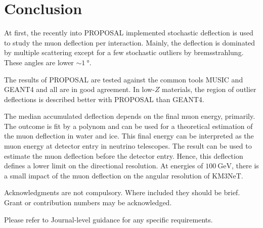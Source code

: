 \documentclass[pdflatex, sn-mathphys]{sn-jnl}%
\theoremstyle{thmstyleone}%
\theoremstyle{thmstyletwo}%
\theoremstyle{thmstylethree}%
\begin{document}
\section{Conclusion}\label{sec:conclusion}

At first, the recently into PROPOSAL implemented stochastic deflection is 
used to study the muon deflection per interaction. Mainly, the deflection 
is dominated by multiple scattering except for a few stochastic 
outliers by bremsstrahlung. These angles are lower $\sim\SI{1}{\degree}$. 

The results of PROPOSAL are tested against the common tools MUSIC and 
GEANT4 and all are in good agreement. In low-$Z$ materials, the region of outlier 
deflections is described better with PROPOSAL than GEANT4.

The median accumulated deflection depends on the final muon energy, primarily. 
The outcome is fit by a polynom and can be used for 
a theoretical estimation of the muon deflection in water and ice.
This final energy can be interpreted as the muon energy at detector entry 
in neutrino telescopes. 
The result can 
be used to estimate the muon deflection before the detector entry.
Hence, this deflection defines a lower limit on the directional resolution.
At energies of $\SI{100}{\giga\electronvolt}$, there is a small impact of the muon deflection on the angular 
resolution of KM3NeT.


\backmatter


Acknowledgments are not compulsory. Where included they should be brief. Grant or contribution numbers may be acknowledged.

Please refer to Journal-level guidance for any specific requirements.
\end{document}
